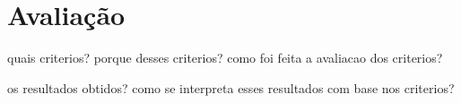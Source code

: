 \chapter{Avaliação}

quais criterios?
porque desses criterios?
como foi feita a avaliacao dos criterios?

os resultados obtidos?
como se interpreta esses resultados com base nos criterios?

